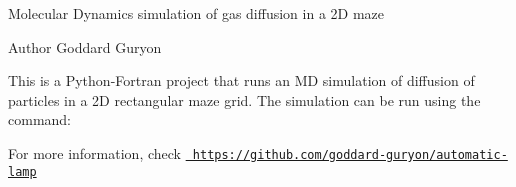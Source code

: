 Molecular Dynamics simulation of gas diffusion in a 2D maze \begin{DoxyAuthor}{Author}
Goddard Guryon
\end{DoxyAuthor}
This is a Python-\/\+Fortran project that runs an MD simulation of diffusion of particles in a 2D rectangular maze grid. The simulation can be run using the command\+: 
\begin{DoxyCode}{0}

\end{DoxyCode}


For more information, check \href{https://github.com/goddard-guryon/automatic-lamp}{\texttt{ https\+://github.\+com/goddard-\/guryon/automatic-\/lamp}} 